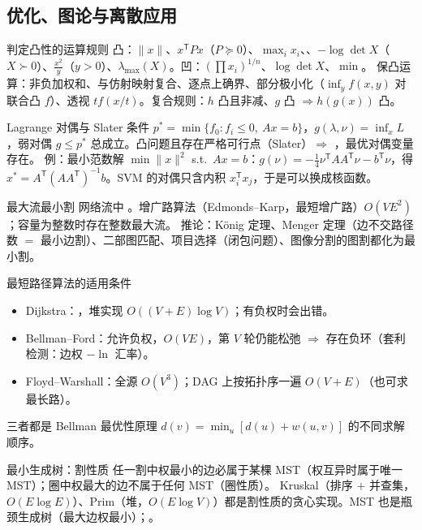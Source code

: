 \subsection{优化、图论与离散应用}

\begin{结论}{判定凸性的运算规则}
凸：$\|x\|$、$x^{\mathsf T}Px$（$P\succeq0$）、$\max_i x_i$、、$-\log\det X$（$X\succ0$）、$\frac{x^2}y$（$y>0$）、$\lambda_{\max}(X)$。凹：$(\prod x_i)^{1/n}$、$\log\det X$、$\min$。
保凸运算：非负加权和、与仿射映射复合、逐点上确界、部分极小化（$\inf_yf(x,y)$ 对联合凸 $f$）、透视 $tf(x/t)$。复合规则：$h$ 凸且非减、$g$ 凸 $\Rightarrow h(g(x))$ 凸。
\end{结论}

\begin{结论}{Lagrange 对偶与 Slater 条件}
$p^*=\min\{f_0:f_i\le0,\ Ax=b\}$，$g(\lambda,\nu)=\inf_x L$，弱对偶 $g\le p^*$ 总成立。凸问题且存在严格可行点（Slater）$\Rightarrow$ ，最优对偶变量存在。
例：最小范数解 $\min\|x\|^2$ s.t.\ $Ax=b$：$g(\nu)=-\frac14\nu^{\mathsf T}AA^{\mathsf T}\nu-b^{\mathsf T}\nu$，得 $x^*=A^{\mathsf T}(AA^{\mathsf T})^{-1}b$。SVM 的对偶只含内积 $x_i^{\mathsf T}x_j$，于是可以换成核函数。
\end{结论}

\begin{结论}{最大流最小割}
网络流中 。增广路算法（Edmonds--Karp，最短增广路）$O(VE^2)$；容量为整数时存在整数最大流。
推论：König 定理、Menger 定理（边不交路径数 $=$ 最小边割）、二部图匹配、项目选择（闭包问题）、图像分割的图割都化为最小割。
\end{结论}

\begin{结论}{最短路径算法的适用条件}
\begin{itemize}\setlength{\itemsep}{0pt}
\item Dijkstra：，堆实现 $O((V+E)\log V)$；有负权时会出错。
\item Bellman--Ford：允许负权，$O(VE)$，第 $V$ 轮仍能松弛 $\Rightarrow$ 存在负环（套利检测：边权 $-\ln$ 汇率）。
\item Floyd--Warshall：全源 $O(V^3)$；DAG 上按拓扑序一遍 $O(V+E)$（也可求最长路）。
\end{itemize}
三者都是 Bellman 最优性原理 $d(v)=\min_u[d(u)+w(u,v)]$ 的不同求解顺序。
\end{结论}

\begin{结论}{最小生成树：割性质}
任一割中权最小的边必属于某棵 MST（权互异时属于唯一 MST）；圈中权最大的边不属于任何 MST（圈性质）。
Kruskal（排序 $+$ 并查集，$O(E\log E)$）、Prim（堆，$O(E\log V)$）都是割性质的贪心实现。MST 也是瓶颈生成树（最大边权最小）；。
\end{结论}

